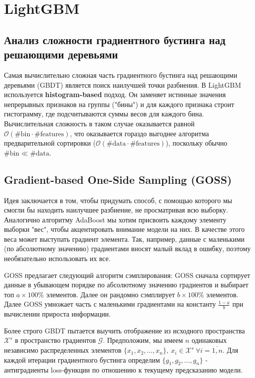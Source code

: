 \section{LightGBM}

\subsection{Анализ сложности градиентного бустинга над решающими деревьями}

Самая вычислительно сложная часть градиентного бустинга над решающими деревьями (GBDT) является поиск наилучшей точки разбиения. В LightGBM используется \textbf{histogram-based} подход. Он заменяет истинные значения непрерывных признаков на группы ("бины") и для каждого признака строит гистограмму, где подсчитываются суммы весов для каждого бина. Вычислительная сложность в таком случае оказывается равной $\mathcal{O}(\#\text{bin}\cdot\#\text{features})$, что оказывается гораздо выгоднее алгоритма предварительной сортировки ($\mathcal{O}(\#\text{data}\cdot\#\text{features})$), поскольку обычно $\#\text{bin} \ll \#\text{data}$.

\subsection{Gradient-based One-Side Sampling (GOSS)}

Идея заключается в том, чтобы придумать способ, с помощью которого мы смогли бы находить наилучшее разбиение, не просматривая всю выборку. Аналогично алгоритму AdaBoost мы хотим присвоить каждому элементу выборки "вес", чтобы акцентировать внимание модели на них. В качестве этого веса может выступать градиент элемента. Так, например, данные с маленькими (по абсолютному значению) градиентами вносят малый вклад в ошибку, поэтому необязательно использовать их все.

GOSS предлагает следующий алгоритм сэмплирования: GOSS сначала сортирует данные в убывающем порядке по абсолютному значению градиентов и выбирает топ $a\times 100\%$ элементов. Далее он рандомно сэмплирует $b\times100\%$ элементов. Далее GOSS умножает часть с маленькими градиентами на константу $\frac{1 - a}{b}$ при вычислении прироста информации.

Более строго GBDT пытается выучить отображение из исходного пространства $\mathcal{X}^s$ в пространство градиентов $\mathcal{G}$. Предположим, мы имеем $n$ одинаковых независимо распределенных элементов $\{x_1, x_2, \ldots, x_n\}, \ x_i \in \mathcal{X}^s \ \forall i = \overline{1,n}$. Для каждой итерации градиентного бустинга определим $\{g_1, g_2, \ldots, g_n\}$ - антиградиенты loss-функции по отношению к текущему предсказанию модели. 


